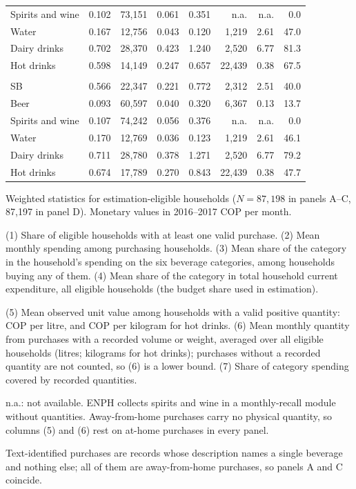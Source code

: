 \documentclass[
  11pt,
]{article}
\begin{document}
\begin{table}[!htbp]
\begin{threeparttable}
\begin{tabular}{lrrrrrrr}
Spirits and wine & 0.102 & 73,151 & 0.061 & 0.351 & n.a. & n.a. & 0.0 \\
Water & 0.167 & 12,756 & 0.043 & 0.120 & 1,219 & 2.61 & 47.0 \\
Dairy drinks & 0.702 & 28,370 & 0.423 & 1.240 & 2,520 & 6.77 & 81.3 \\
Hot drinks & 0.598 & 14,149 & 0.247 & 0.657 & 22,439 & 0.38 & 67.5 \\
\addlinespace\multicolumn{8}{l}{\textit{D. Coded and text-identified purchases --- combined market}} \\
SB & 0.566 & 22,347 & 0.221 & 0.772 & 2,312 & 2.51 & 40.0 \\
Beer & 0.093 & 60,597 & 0.040 & 0.320 & 6,367 & 0.13 & 13.7 \\
Spirits and wine & 0.107 & 74,242 & 0.056 & 0.376 & n.a. & n.a. & 0.0 \\
Water & 0.170 & 12,769 & 0.036 & 0.123 & 1,219 & 2.61 & 46.1 \\
Dairy drinks & 0.711 & 28,780 & 0.378 & 1.271 & 2,520 & 6.77 & 79.2 \\
Hot drinks & 0.674 & 17,789 & 0.270 & 0.843 & 22,439 & 0.38 & 47.7 \\
\bottomrule
\end{tabular}
\begin{tablenotes}[flushleft]
\footnotesize
\item Weighted statistics for estimation-eligible households ($N = 87,198$ in panels A--C, 87,197 in panel D). Monetary values in 2016--2017 COP per month.
\item (1) Share of eligible households with at least one valid purchase. (2) Mean monthly spending among purchasing households. (3) Mean share of the category in the household's spending on the six beverage categories, among households buying any of them. (4) Mean share of the category in total household current expenditure, all eligible households (the budget share used in estimation).
\item (5) Mean observed unit value among households with a valid positive quantity: COP per litre, and COP per kilogram for hot drinks. (6) Mean monthly quantity from purchases with a recorded volume or weight, averaged over all eligible households (litres; kilograms for hot drinks); purchases without a recorded quantity are not counted, so (6) is a lower bound. (7) Share of category spending covered by recorded quantities.
\item n.a.: not available. ENPH collects spirits and wine in a monthly-recall module without quantities. Away-from-home purchases carry no physical quantity, so columns (5) and (6) rest on at-home purchases in every panel.
\item Text-identified purchases are records whose description names a single beverage and nothing else; all of them are away-from-home purchases, so panels A and C coincide.
\end{tablenotes}
\end{threeparttable}
\end{table}
\end{document}
